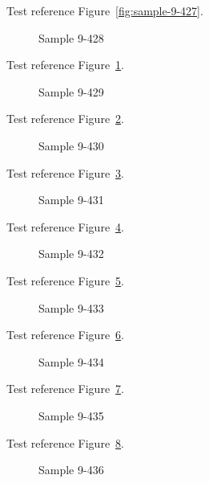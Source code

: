 Test reference Figure~\ref{fig:sample-9-427}.

\begin{figure}[tbhp]
\caption{Sample 9-428}
\label{fig:sample-9-428}
\end{figure}

Test reference Figure~\ref{fig:sample-9-428}.

\begin{figure}[tbhp]
\caption{Sample 9-429}
\label{fig:sample-9-429}
\end{figure}

Test reference Figure~\ref{fig:sample-9-429}.

\begin{figure}[tbhp]
\caption{Sample 9-430}
\label{fig:sample-9-430}
\end{figure}

Test reference Figure~\ref{fig:sample-9-430}.

\begin{figure}[tbhp]
\caption{Sample 9-431}
\label{fig:sample-9-431}
\end{figure}

Test reference Figure~\ref{fig:sample-9-431}.

\begin{figure}[tbhp]
\caption{Sample 9-432}
\label{fig:sample-9-432}
\end{figure}

Test reference Figure~\ref{fig:sample-9-432}.

\begin{figure}[tbhp]
\caption{Sample 9-433}
\label{fig:sample-9-433}
\end{figure}

Test reference Figure~\ref{fig:sample-9-433}.

\begin{figure}[tbhp]
\caption{Sample 9-434}
\label{fig:sample-9-434}
\end{figure}

Test reference Figure~\ref{fig:sample-9-434}.

\begin{figure}[tbhp]
\caption{Sample 9-435}
\label{fig:sample-9-435}
\end{figure}

Test reference Figure~\ref{fig:sample-9-435}.

\begin{figure}[tbhp]
\caption{Sample 9-436}
\label{fig:sample-9-436}
\end{figure}

